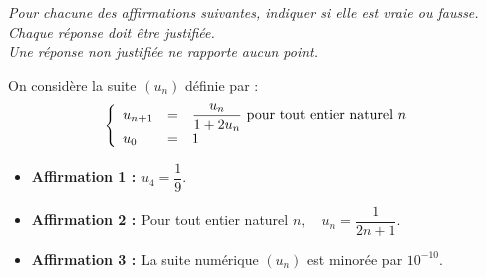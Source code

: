 \emph{Pour chacune des affirmations suivantes, indiquer si elle est vraie ou fausse.\\
Chaque réponse doit être justifiée.\\
Une réponse non justifiée ne rapporte aucun point.}

On considère la suite $\left(u_{n}\right)$ définie par :
\[\left\{\begin{array}{l c l}u_{n + 1} &=& \dfrac{u_{n}}{1 + 2 u_{n}} \text { pour tout entier naturel } n \\ u_{0} &=& 1\end{array}\right.\]

\begin{itemize}
\item \textbf{Affirmation 1 :} \og{} $u_{4} = \dfrac{1}{9}$. \fg{}
\item \textbf{Affirmation 2 :} \og{}Pour tout entier naturel $n, \quad u_{n} = \dfrac{1}{2 n + 1}$.\fg{}
\item \textbf{Affirmation 3 :} \og{}La suite numérique $\left(u_{n}\right)$ est minorée par $10^{-10}$.\fg{}
\end{itemize}
